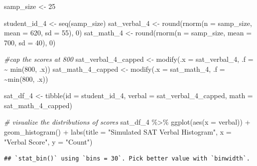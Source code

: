 \documentclass[
]{book}
\newenvironment{Shaded}{\begin{snugshade}}{\end{snugshade}}
\newcommand{\AttributeTok}[1]{\textcolor[rgb]{0.77,0.63,0.00}{#1}}
\newcommand{\CommentTok}[1]{\textcolor[rgb]{0.56,0.35,0.01}{\textit{#1}}}
\newcommand{\DecValTok}[1]{\textcolor[rgb]{0.00,0.00,0.81}{#1}}
\newcommand{\FunctionTok}[1]{\textcolor[rgb]{0.00,0.00,0.00}{#1}}
\newcommand{\NormalTok}[1]{#1}
\newcommand{\OtherTok}[1]{\textcolor[rgb]{0.56,0.35,0.01}{#1}}
\newcommand{\SpecialCharTok}[1]{\textcolor[rgb]{0.00,0.00,0.00}{#1}}
\newcommand{\StringTok}[1]{\textcolor[rgb]{0.31,0.60,0.02}{#1}}
\begin{document}
\begin{Shaded}
\begin{Highlighting}[]
\NormalTok{samp\_size }\OtherTok{\textless{}{-}} \DecValTok{25}

\NormalTok{student\_id\_4 }\OtherTok{\textless{}{-}} \FunctionTok{seq}\NormalTok{(samp\_size)}
\NormalTok{sat\_verbal\_4 }\OtherTok{\textless{}{-}} \FunctionTok{round}\NormalTok{(}\FunctionTok{rnorm}\NormalTok{(}\AttributeTok{n =}\NormalTok{ samp\_size, }\AttributeTok{mean =} \DecValTok{620}\NormalTok{, }\AttributeTok{sd =} \DecValTok{55}\NormalTok{), }\DecValTok{0}\NormalTok{)}
\NormalTok{sat\_math\_4 }\OtherTok{\textless{}{-}} \FunctionTok{round}\NormalTok{(}\FunctionTok{rnorm}\NormalTok{(}\AttributeTok{n =}\NormalTok{ samp\_size, }\AttributeTok{mean =} \DecValTok{700}\NormalTok{, }\AttributeTok{sd =} \DecValTok{40}\NormalTok{), }\DecValTok{0}\NormalTok{)}

\CommentTok{\#cap the scores at 800}
\NormalTok{sat\_verbal\_4\_capped }\OtherTok{\textless{}{-}} \FunctionTok{modify}\NormalTok{(}\AttributeTok{.x =}\NormalTok{ sat\_verbal\_4, }\AttributeTok{.f =} \SpecialCharTok{\textasciitilde{}} \FunctionTok{min}\NormalTok{(}\DecValTok{800}\NormalTok{, .x))}
\NormalTok{sat\_math\_4\_capped }\OtherTok{\textless{}{-}} \FunctionTok{modify}\NormalTok{(}\AttributeTok{.x =}\NormalTok{ sat\_math\_4, }\AttributeTok{.f =} \SpecialCharTok{\textasciitilde{}}\FunctionTok{min}\NormalTok{(}\DecValTok{800}\NormalTok{, .x))}


\NormalTok{sat\_df\_4 }\OtherTok{\textless{}{-}} \FunctionTok{tibble}\NormalTok{(}\AttributeTok{id =}\NormalTok{ student\_id\_4,}
                   \AttributeTok{verbal =}\NormalTok{ sat\_verbal\_4\_capped,}
                   \AttributeTok{math =}\NormalTok{ sat\_math\_4\_capped)}

\CommentTok{\# visualize the distributions of scores}
\NormalTok{sat\_df\_4 }\SpecialCharTok{\%\textgreater{}\%} \FunctionTok{ggplot}\NormalTok{(}\FunctionTok{aes}\NormalTok{(}\AttributeTok{x =}\NormalTok{ verbal)) }\SpecialCharTok{+}
  \FunctionTok{geom\_histogram}\NormalTok{() }\SpecialCharTok{+}
  \FunctionTok{labs}\NormalTok{(}\AttributeTok{title =} \StringTok{"Simulated SAT Verbal Histogram"}\NormalTok{,}
       \AttributeTok{x =} \StringTok{"Verbal Score"}\NormalTok{,}
       \AttributeTok{y =} \StringTok{"Count"}\NormalTok{)}
\end{Highlighting}
\end{Shaded}

\begin{verbatim}
## `stat_bin()` using `bins = 30`. Pick better value with `binwidth`.
\end{verbatim}
\end{document}
